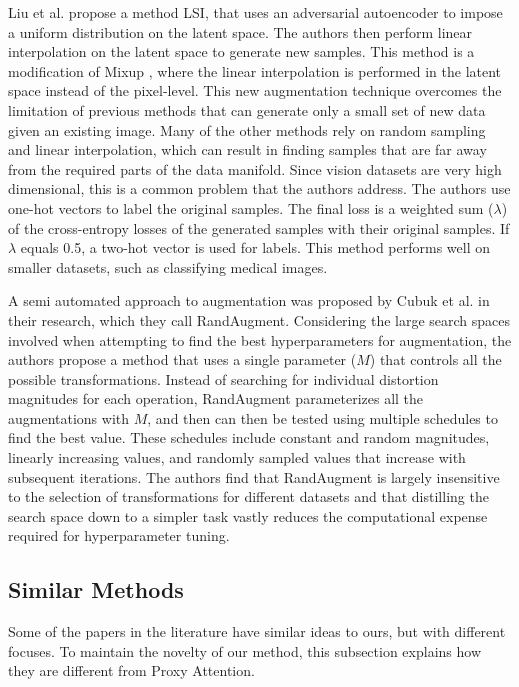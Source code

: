 Liu et al. \cite{liuDataAugmentationLatent2018} propose a method LSI, that uses an adversarial autoencoder to impose a uniform distribution on the latent space. The authors then perform linear interpolation on the latent space to generate new samples. This method is a modification of Mixup \cite{zhangMixupEmpiricalRisk2018}, where the linear interpolation is performed in the latent space instead of the pixel-level. This new augmentation technique overcomes the limitation of previous methods that can generate only a small set of new data given an existing image. Many of the other methods rely on random sampling and linear interpolation, which can result in finding samples that are far away from the required parts of the data manifold. Since vision datasets are very high dimensional, this is a common problem that the authors address. The authors use one-hot vectors to label the original samples. The final loss is a weighted sum ($\lambda$) of the cross-entropy losses of the generated samples with their original samples. If $\lambda$ equals 0.5, a two-hot vector is used for labels. This method performs well on smaller datasets, such as classifying medical images.

A semi automated approach to augmentation was proposed by Cubuk et al. \cite{cubukRandaugmentPracticalAutomated2020} in their research, which they call RandAugment. Considering the large search spaces involved when attempting to find the best hyperparameters for augmentation, the authors propose a method that uses a single parameter ($M$) that controls all the possible transformations. Instead of searching for individual distortion magnitudes for each operation, RandAugment parameterizes all the augmentations with $M$, and then can then be tested using multiple schedules to find the best value. These schedules include constant and random magnitudes, linearly increasing values, and randomly sampled values that increase with subsequent iterations. The authors find that RandAugment is largely insensitive to the selection of transformations for different datasets and that distilling the search space down to a simpler task vastly reduces the computational expense required for hyperparameter tuning.


\subsection{Similar Methods}
Some of the papers in the literature have similar ideas to ours, but with different focuses. To maintain the novelty of our method, this subsection explains how they are different from Proxy Attention.

